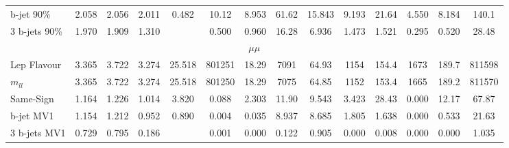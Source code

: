 \begin{table}
\begin{center}
{\begin{tabular}{l||cccc||cc|ccc|ccc||c }
            b-jet 90\%    &        2.058 &        2.056 &        2.011 &      0.482 &       10.12  &        8.953 &       61.62  &       15.843 &        9.193 &       21.64  &        4.550 &        8.184 &      140.1      \\        
            3 b-jets 90\% &        1.970 &        1.909 &        1.310 &            &        0.500 &        0.960 &       16.28  &        6.936 &        1.473 &        1.521 &        0.295 &        0.520 &       28.48     \\\hline\hline  
            \multicolumn{14}{c}{$\mu\mu$} \\ \hline 
            Lep Flavour   &        3.365 &        3.722 &        3.274 &     25.518 &   801251     &       18.29  &     7091     &       64.93  &     1154     &      154.4   &     1673     &      189.7   &   811598        \\        
            $m_{ll}$      &        3.365 &        3.722 &        3.274 &     25.518 &   801250     &       18.29  &     7075     &       64.85  &     1152     &      153.4   &     1665     &      189.2   &   811570        \\        
            Same-Sign     &        1.164 &        1.226 &        1.014 &      3.820 &        0.088 &        2.303 &       11.90  &        9.543 &        3.423 &       28.43  &        0.000 &       12.17  &       67.87     \\\hline  
                                                                                                                                                                                                                                     
            b-jet MV1     &        1.154 &        1.212 &        0.952 &      0.890 &        0.004 &        0.035 &        8.937 &        8.685 &        1.805 &        1.638 &        0.000 &        0.533 &       21.63     \\        
            3 b-jets MV1  &        0.729 &        0.795 &        0.186 &            &        0.001 &        0.000 &        0.122 &        0.905 &        0.000 &        0.008 &        0.000 &        0.000 &        1.035    \\\hline  
                                                                                                                                                                                                                                     

\end{tabular}}
\end{center}
\end{table}
